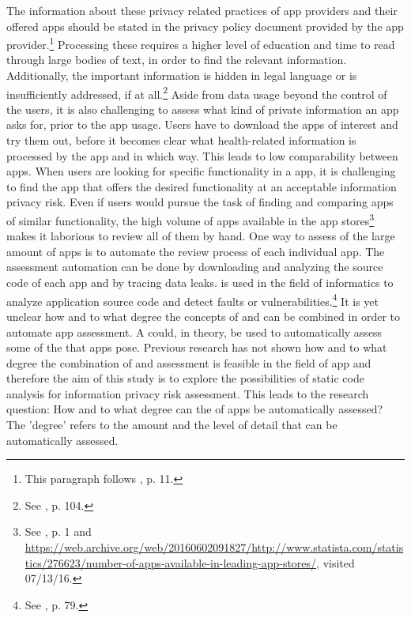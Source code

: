 The information about these privacy related practices of app providers and their offered apps should be stated in the privacy policy document provided by the app provider.\footnote{This paragraph follows \cite{Dehling2014}, p. 11.}
Processing these \pps requires a higher level of education and time to read through large bodies of text, in order to find the relevant information. 
Additionally, the important information is hidden in legal language or is  insufficiently addressed, if at all.\footnote{See \cite{Pollach2007}, p. 104.}
Aside from data usage beyond the control of the users, it is also challenging to assess what kind of private information an app asks for, prior to the app usage. 
Users have to download the apps of interest and try them out, before it becomes clear what health-related information is processed by the app and in which  way. 
This leads to low comparability between apps. 
When users are looking for specific functionality in a \mH app, it is challenging to find the app that offers the desired functionality at an acceptable information privacy risk. 
Even if users would pursue the task of finding and comparing \mH apps of similar functionality, the high volume of apps available in the app stores\footnote{\raggedright See \cite{Enck2011}, p. 1 and \url{https://web.archive.org/web/20160602091827/http://www.statista.com/statistics/276623/number-of-apps-available-in-leading-app-stores/}, visited 07/13/16.} makes it laborious to review all of them by hand.
One way to assess \ipr of the large amount of \mH apps is to automate the review process of each individual app. 
The assessment automation can be done by downloading and analyzing the source code of each app and by tracing data leaks. 
\Sca is used in the field of informatics to analyze application source code and detect faults or vulnerabilities.\footnote{See \cite{Baca2008}, p. 79.} 
It is yet unclear how and to what degree the concepts of \sca and \pra can be combined in order to automate app assessment.
A \sca could, in theory, be used to automatically assess some of the \ipr that \mH apps pose.
Previous research has not shown how and to what degree the combination of \sca and \ipr assessment is feasible in the field of \mH app \pra and therefore the aim of this study is to explore the possibilities of static code analysis for information privacy risk assessment. 
This leads to the research question: How and to what degree can the \ipr of \mH apps be automatically assessed?
The 'degree' refers to the amount and the level of detail that \iprfs can be automatically assessed.

